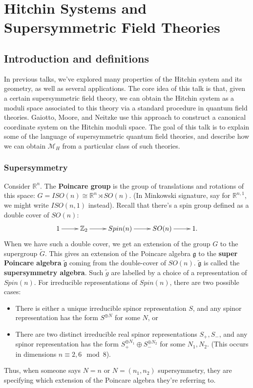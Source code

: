\documentclass[oneside,english]{amsbook}
\numberwithin{section}{chapter}
\numberwithin{equation}{section}
\numberwithin{figure}{section}
\theoremstyle{plain}
\theoremstyle{definition}
\theoremstyle{remark}
\theoremstyle{definition}
\theoremstyle{definition}
\theoremstyle{plain}
\begin{document}
\chapter{Hitchin Systems and Supersymmetric Field Theories}

\section{Introduction and definitions}

In previous talks, we've explored many properties of the Hitchin system
and its geometry, as well as several applications. The core idea of
this talk is that, given a certain supersymmetric field theory, we
can obtain the Hitchin system as a moduli space associated to this
theory via a standard procedure in quantum field theories. Gaiotto,
Moore, and Neitzke \cite{GMN} use this approach to construct a canonical
coordinate system on the Hitchin moduli space. The goal of this talk
is to explain some of the language of supersymmetric quantum field
theories, and describe how we can obtain $\mathcal{M}_{H}$ from a
particular class of such theories. 


\subsection{Supersymmetry}

Consider $\mathbb{R}^{n}$. The \textbf{Poincare group} is the group
of translations and rotations of this space: $G=ISO(n)\cong\mathbb{R}^{n}\rtimes SO(n)$.
(In Minkowski signature, say for $\mathbb{R}^{n,1}$, we might write
$ISO(n,1)$ instead). Recall that there's a spin group defined as
a double cover of $SO(n)$: 
\[
\xymatrix{1\ar[r] & \mathbb{Z}_{2}\ar[r] & Spin(n)\ar[r] & SO(n)\ar[r] & 1.}
\]
When we have such a double cover, we get an extension of the group
$G$ to the supergroup $\tilde{G}$. This gives an extension of the
Poincare algebra $\mathfrak{g}$ to the \textbf{super Poincare algebra}
$\tilde{\mathfrak{g}}$ coming from the double-cover of $SO(n)$.
$\tilde{\mathfrak{g}}$ is called the \textbf{supersymmetry algebra}.
Such $\tilde{g}$ are labelled by a choice of a representation of
$Spin(n)$. For irreducible representations of $Spin(n)$, there are
two possible cases:
\begin{itemize}
\item There is either a unique irreducible spinor representation $S$, and
any spinor representation has the form $S^{\oplus N}$ for some $N$,
or
\item There are two distinct irreducible real spinor representations $S_{+},S_{-}$,
and any spinor representation has the form $S_{+}^{\oplus N_{1}}\oplus S_{-}^{\oplus N_{2}}$
for some $N_{1},N_{2}$. (This occurs in dimensions $n\equiv2,6\mod8$). 
\end{itemize}
Thus, when someone says $N=n$ or $N=\left(n_{1},n_{2}\right)$ supersymmetry,
they are specifying which extension of the Poincare algebra they're
referring to.
\end{document}
